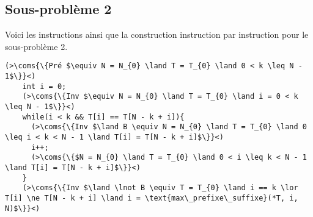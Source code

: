 \subsection{Sous-problème 2}

Voici les instructions ainsi que la construction instruction par instruction pour le sous-problème 2.
\begin{lstlisting}[caption={Sous-problème 2}]
    (>\coms{\{Pré $\equiv N = N_{0} \land T = T_{0} \land 0 < k \leq N - 1$\}}<)
    int i = 0;
    (>\coms{\{Inv $\equiv N = N_{0} \land T = T_{0} \land i = 0 < k \leq N - 1$\}}<)
    while(i < k && T[i] == T[N - k + i]){
      (>\coms{\{Inv $\land B \equiv N = N_{0} \land T = T_{0} \land 0 \leq i < k < N - 1 \land T[i] = T[N - k + i]$\}}<) 
      i++;
      (>\coms{\{$N = N_{0} \land T = T_{0} \land 0 < i \leq k < N - 1 \land T[i] = T[N - k + i]$\}}<)
    }
    (>\coms{\{Inv $\land \lnot B \equiv T = T_{0} \land i == k \lor T[i] \ne T[N - k + i] \land i = \text{max\_prefixe\_suffixe}(*T, i, N)$\}}<)
\end{lstlisting}

